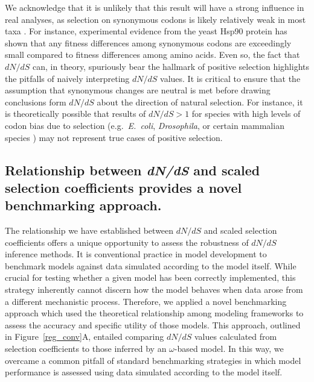 \documentclass[11pt]{article}
\begin{document}
We acknowledge that it is unlikely that this result will have a strong influence in real analyses, as selection on synonymous codons is likely relatively weak in most taxa \cite{HershbergPetrov2008}. For instance, experimental evidence from the yeast Hsp90 protein has shown that any fitness differences among synonymous codons are exceedingly small compared to fitness differences among amino acids.  Even so, the fact that $dN/dS$ can, in theory, spuriously bear the hallmark of positive selection highlights the pitfalls of naively interpreting $dN/dS$ values. It is critical to ensure that the assumption that synonymous changes are neutral is met before drawing conclusions form $dN/dS$ about the direction of natural selection. For instance, it is theoretically possible that results of $dN/dS > 1$ for species with high levels of codon bias due to selection (e.g.\ \emph{E.\ coli}, \emph{Drosophila}, or certain mammalian species \cite{Duret2002, Chamaryetal2006, PlotkinKudla2010}) may not represent true cases of positive selection. 

\subsection*{Relationship between \emph{dN/dS} and scaled selection coefficients provides a novel benchmarking approach.}

The relationship we have established between $dN/dS$ and scaled selection coefficients offers a unique opportunity to assess the robustness of $dN/dS$ inference methods. It is conventional practice in model development to benchmark models against data simulated according to the model itself. While crucial for testing whether a given model has been correctly implemented, this strategy inherently cannot discern how the model behaves when data arose from a different mechanistic process. Therefore, we applied a novel benchmarking approach which used the theoretical relationship among modeling frameworks to assess the accuracy and specific utility of those models. This approach, outlined in Figure~\ref{reg_conv}A, entailed comparing $dN/dS$ values calculated from selection coefficients to those inferred by an $\omega$-based model. In this way, we overcame a common pitfall of standard benchmarking strategies in which model performance is assessed using data simulated according to the model itself.
\end{document}
